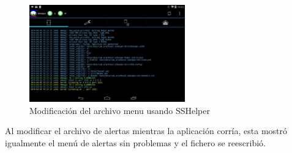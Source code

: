         \begin{figure}[H]
  \begin{center}
    \includegraphics[width=0.6\textwidth]{imagenes/fig47.png}
    \caption{Modificación del archivo menu usando SSHelper}
  \end{center}
\end{figure}


Al modificar el archivo de alertas mientras la aplicación corría, esta mostró igualmente el menú de alertas sin problemas y el fichero se reescribió.